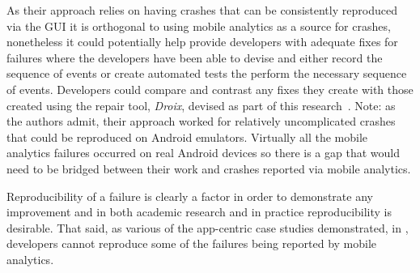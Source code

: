 As their approach relies on having crashes that can be consistently reproduced via the GUI it is orthogonal to using mobile analytics as a source for crashes, nonetheless it could potentially help provide developers with adequate fixes for failures where the developers have been able to devise and either record the sequence of events or create automated tests the perform the necessary sequence of events. Developers could compare and contrast any fixes they create with those created using the repair tool, \textit{Droix}, devised as part of this research~. Note: as the authors admit, their approach worked for relatively uncomplicated crashes that could be reproduced on Android emulators. Virtually all the mobile analytics failures occurred on real Android devices so there is a gap that would need to be bridged between their work and crashes reported via mobile analytics.  

Reproducibility of a failure is clearly a factor in order to demonstrate any improvement and in both academic research and in practice reproducibility is desirable. That said, as various of the app-centric case studies demonstrated, in , developers cannot reproduce some of the failures being reported by mobile analytics. %

